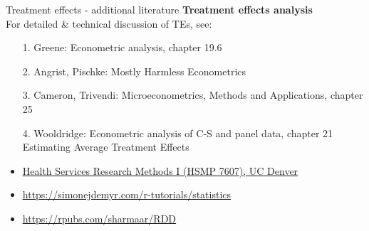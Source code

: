 \documentclass{beamer}
\begin{document}
\begin{frame}{Treatment effects - additional literature}
\textbf{Treatment effects analysis}\\
\medskip
For detailed \& technical discussion of TEs, see:\\
\medskip
\begin{itemize}
\item[1.] Greene: Econometric analysis, chapter 19.6
\item[2.] Angrist, Pischke: Mostly Harmless Econometrics
\item[3.] Cameron, Trivendi: Microeconometrics, Methods and Applications, chapter 25
\item[4.] Wooldridge: Econometric analysis of C-S and panel data, chapter 21 Estimating Average Treatment Effects
\bigskip
\item \textcolor{blue}{\underline{\href{https://clas.ucdenver.edu/marcelo-perraillon/teaching/health-services-research-methods-i-hsmp-7607}{Health Services Research Methods I (HSMP 7607), UC Denver}}}
\item \textcolor{blue}{\underline{\href{https://simonejdemyr.com/r-tutorials/statistics/tutorial8.html}{https://simonejdemyr.com/r-tutorials/statistics}}}
\item \textcolor{blue}{\underline{\href{https://rpubs.com/sharmaar/RDD}{https://rpubs.com/sharmaar/RDD}}}
\end{itemize}
\end{frame}
\end{document}
